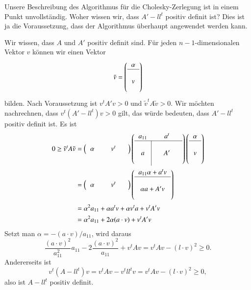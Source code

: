 {\small
Unsere Beschreibung des Algorithmus für die Cholesky-Zerlegung ist in
einem Punkt unvollständig.
Woher wissen wir, dass $A'-ll^t$ positiv
definit ist? Dies ist ja die Voraussetzung, dass der Algorithmus
überhaupt angewendet werden kann.

Wir wissen, dass $A$ und $A'$ positiv definit sind.
Für jeden $n-1$-dimensionalen Vektor $v$ können wir einen Vektor
\[
\tilde v=\left(
\begin{tabular}{c}
$\alpha$\\
\hline
$\mathstrut$\\
$v$\\
$\mathstrut$
\end{tabular}
\right)
\]
bilden.
Nach Voraussetzung ist $v^tA'v>0$ und $\tilde v^tA\tilde v>0$.
Wir möchten nachrechnen, dass $v^t(A'-ll^t)v>0$ gilt, das würde bedeuten,
dass $A'-ll^t$ positiv definit ist.
Es ist
\begin{align*}
0\ge
\tilde v^tA\tilde v
&=
\left(
\begin{tabular}{>{$}c<{$}|>{$}c<{$}>{$}c<{$}>{$}c<{$}}
\alpha&&v^t&
\end{tabular}
\right)
\left(
\begin{tabular}{>{$}c<{$}|>{$}c<{$}>{$}c<{$}>{$}c<{$}}
a_{11}&&a^t&\\
\hline
&&&\\
a&&A'&\\
&&&
\end{tabular}
\right)
\left(
\begin{tabular}{>{$}c<{$}}
\alpha\\
\hline
\mathstrut\\
v\\
\mathstrut
\end{tabular}
\right)
\\
&=
\left(
\begin{tabular}{>{$}c<{$}|>{$}c<{$}>{$}c<{$}>{$}c<{$}}
\alpha&&v^t&
\end{tabular}
\right)
\left(
\begin{tabular}{>{$}c<{$}}
a_{11}\alpha+a^tv\\
\hline
\\
\alpha a+A'v\\
\\
\end{tabular}
\right)
\\
&=\alpha^2a_{11}+\alpha a^tv+\alpha v^ta+v^tA'v
\\
&=\alpha^2a_{11}+2\alpha (a\cdot v)+v^tA'v
\end{align*}
Setzt man $\alpha=-(a\cdot v)/a_{11}$, wird daraus
\[
\frac{(a\cdot v)^2}{a_{11}^2}a_{11}-2\frac{(a\cdot v)^2}{a_{11}}+v^tAv
=v^tAv-(l\cdot v)^2\ge 0.
\]
Andererseits ist
\[
v^t(A-ll^t)v=v^tAv-v^tll^tv=v^tAv-(l\cdot v)^2\ge 0,
\]
also ist $A-ll^t$ positiv definit.
}

